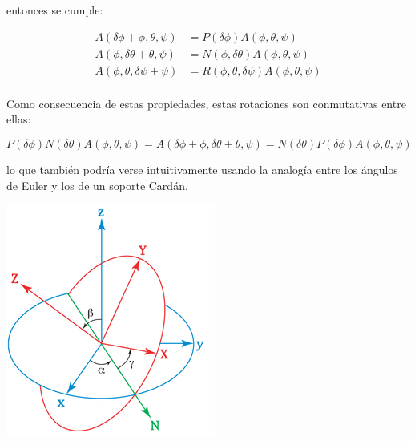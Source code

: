 entonces se cumple:

\begin{equation}
    \begin{array}{ll}
    A(\delta \phi +\phi ,\theta ,\psi ) & = P(\delta \phi )A(\phi ,\theta ,\psi) \\
    A(\phi ,\delta \theta +\theta ,\psi ) & = N(\phi ,\delta \theta )A(\phi ,\theta ,\psi ) \\
    A(\phi,\theta ,\delta \psi +\psi ) &=R(\phi ,\theta ,\delta \psi )A(\phi ,\theta ,\psi) \\
    \end{array}
\end{equation}

Como consecuencia de estas propiedades, estas rotaciones son conmutativas
entre ellas:

\begin{equation}
    P(\delta \phi )N(\delta \theta )A(\phi ,\theta ,\psi)=A(\delta \phi +\phi ,\delta \theta +\theta ,\psi )=N(\delta \theta )P(\delta \phi )A(\phi ,\theta ,\psi )
\end{equation}

lo que también podría verse intuitivamente usando la analogía entre los ángulos
de Euler y los de un soporte Cardán.

    \includegraphics[scale=0.7]{figures/euler_angles.png}

